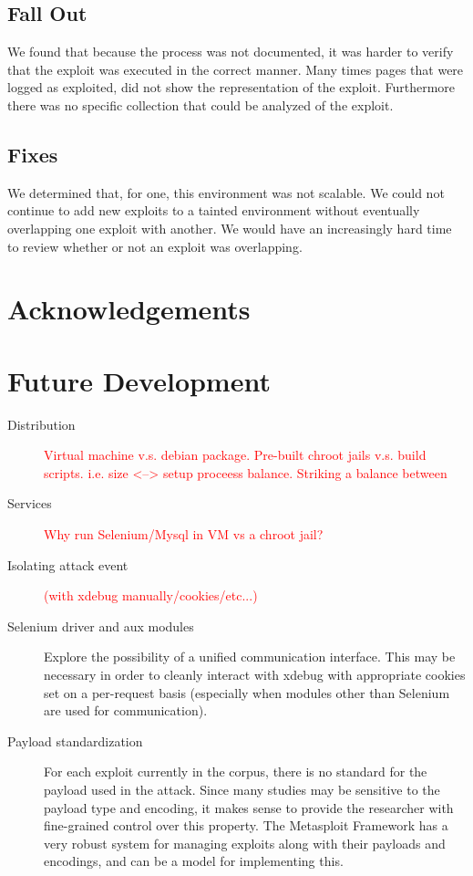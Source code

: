 \documentclass[letterpaper,twocolumn,10pt]{article}
\begin{document}
\subsection{Fall Out}
We found that because the process was not documented, it was harder to verify that the exploit was executed in the correct manner.  Many times pages that were logged as exploited, did not show the representation of the exploit.  Furthermore there was no specific collection that could be analyzed of the exploit.

\subsection{Fixes}
We determined that, for one, this environment was not scalable.  We could not continue to add new exploits to a tainted environment without eventually overlapping one exploit with another.  We would have an increasingly hard time to review whether or not an exploit was overlapping.

\section{Acknowledgements}


\section{Future Development}
 \begin{description}
   \item[Distribution]
     \textcolor{red}{Virtual machine v.s. debian package. Pre-built chroot jails v.s. build scripts.
     i.e. size <--> setup proceess balance. Striking a balance between}
   \item[Services]
     \textcolor{red}{Why run Selenium/Mysql in VM vs a chroot jail?}
   \item[Isolating attack event]
     \textcolor{red}{(with xdebug manually/cookies/etc...)}   
   \item[Selenium driver and aux modules]
   Explore the possibility of a unified communication interface. This may be necessary in order to cleanly interact with xdebug with appropriate cookies set on a per-request basis (especially when modules other than Selenium are used for communication).
   \item[Payload standardization]
For each exploit currently in the corpus, there is no standard for the payload used in the attack. Since many studies may be sensitive to the payload type and encoding, it makes sense to provide the researcher with fine-grained control over this property. The Metasploit Framework has a very robust system for managing exploits along with their payloads and encodings, and can be a model for implementing this.
 \end{description}
\end{document}
